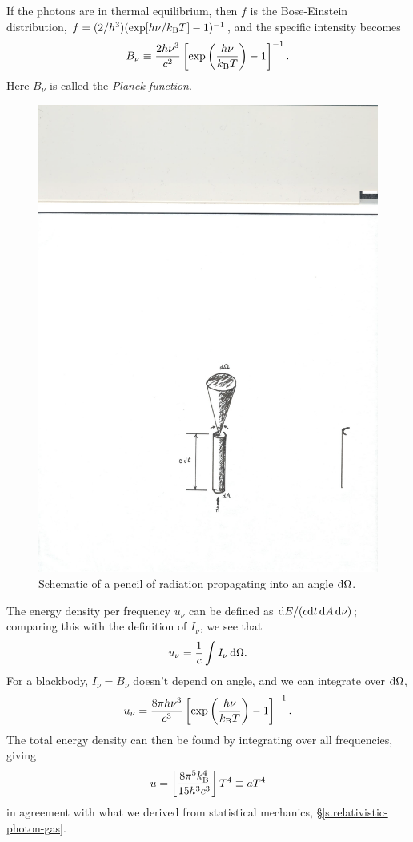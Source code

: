 If the photons are in thermal equilibrium, then $f$ is the Bose-Einstein distribution, $f = (2/h^{3})(\exp[h\nu/k_\mathrm{B} T]-1)^{-1}$, and the specific intensity becomes
\begin{equation}\label{e.Bnu}
B_{\nu} \equiv \frac{2 h\nu^{3}}{c^{2}} \left[\exp\left(\frac{h\nu}{k_\mathrm{B} T}\right)-1\right]^{-1}.
\end{equation}
Here $B_{\nu}$ is called the \emph{Planck function}.

\begin{figure}[htbp]
\centering\includegraphics{intensity-schematic}
\caption{\label{f.intensity-schematic}Schematic of a pencil of radiation propagating into an angle $\mathrm{d}\Omega$.}
\end{figure}

The energy density per frequency $u_{\nu}$ can be defined as $\mathrm{d} E/(c \mathrm{d} t\,\mathrm{d} A\,\mathrm{d}\nu)$; comparing this with the definition of $I_{\nu}$, we see that
\[
u_{\nu} = \frac{1}{c}\int I_{\nu}\,\mathrm{d}\Omega .
\]
For a blackbody, $I_{\nu}=B_{\nu}$ doesn't depend on angle, and we can integrate over $\mathrm{d}\Omega$,
\begin{equation}\label{e.radiation-energy-density}
u_{\nu}= \frac{8\pi h\nu^{3}}{c^{3}}\left[\exp\left(\frac{h\nu}{k_\mathrm{B} T}\right)-1\right]^{-1}.
\end{equation}
The total energy density can then be found by integrating over all frequencies, giving
\[ u = \left[\frac{8\pi^{5}k_\mathrm{B}^{4}}{15 h^{3}c^{3}}\right] T^{4}\equiv aT^{4} \]
in agreement with what we derived from statistical mechanics, \S\ref{s.relativistic-photon-gas}.

